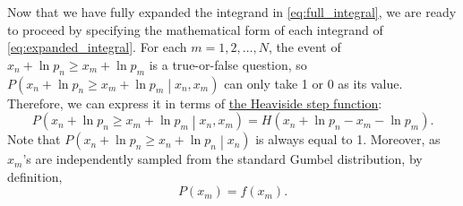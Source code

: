 \documentclass{book}[12pt]
\begin{document}
Now that we have fully expanded the integrand in \cref{eq:full_integral}, we are ready to proceed by specifying the mathematical form of each integrand of \cref{eq:expanded_integral}. For each $m=1,2,\dots,N$, the event of $x_n+\ln p_n\geq x_m+\ln p_m$ is a true-or-false question, so $P\left(x_n+\ln p_n\geq x_m+\ln p_m\middle|x_n,x_m\right)$ can only take 1 or 0 as its value. Therefore, we can express it in terms of \href{https://en.wikipedia.org/wiki/Heaviside_step_function}{the Heaviside step function}:
\begin{equation}
    P\left(x_n+\ln p_n\geq x_m+\ln p_m\middle|x_n,x_m\right)=H(x_n+\ln p_n-x_m-\ln p_m).
\end{equation}
Note that $P\left(x_n+\ln p_n\geq x_n+\ln p_n\middle|x_n\right)$ is always equal to 1. Moreover, as $x_m$'s are independently sampled from the standard Gumbel distribution, by definition,
\begin{equation}
    P\left(x_m\right)=f\left(x_m\right).
\end{equation}
\end{document}
